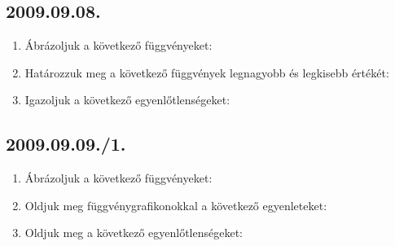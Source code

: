 \subsection*{2009.09.08.}
\begin{enumerate}
\item Ábrázoljuk a következő függvényeket:

\item Határozzuk meg a következő függvények legnagyobb és legkisebb értékét:
\item Igazoljuk a következő egyenlőtlenségeket:
\end{enumerate}

\subsection*{2009.09.09./1.}
\begin{enumerate}
\item Ábrázoljuk a következő függvényeket:
\item Oldjuk meg függvénygrafikonokkal a következő egyenleteket:

\item Oldjuk meg a következő egyenlőtlenségeket:
\end{enumerate}


